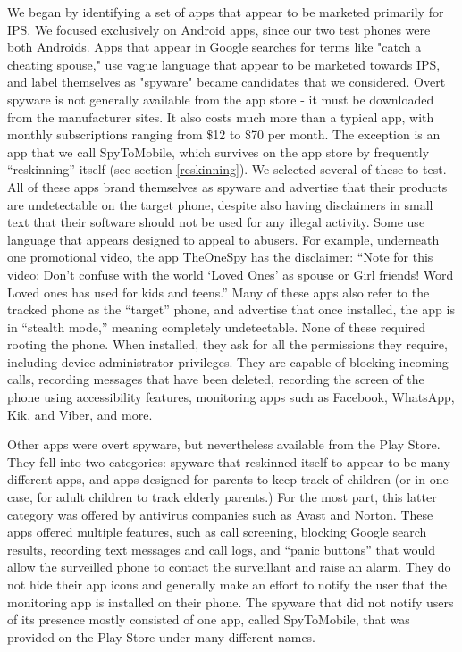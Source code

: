 \documentclass[acmtog]{acmart}
\begin{document}
We began by identifying a set of apps that appear to be 
marketed primarily for IPS. We focused exclusively on Android apps, since our 
two test phones were both Androids. Apps that appear in Google searches for 
terms like 
"catch a cheating spouse," use vague language that appear to be marketed 
towards IPS, and label themselves as "spyware" became candidates that we 
considered. Overt spyware is not generally available from the app store - it 
must be downloaded from the manufacturer sites. It also costs much more than a 
typical app, with monthly 
subscriptions ranging from \$12 to \$70 per month. The exception is an app that 
we call SpyToMobile, which survives on the app store by frequently 
``reskinning'' itself (see section \ref{reskinning}).  
We selected several of these to test. All of these apps brand themselves as 
spyware and advertise that their products are undetectable on the target phone, 
despite also having disclaimers in small text that their software should not be 
used for any illegal activity. Some use language that appears designed to 
appeal to abusers. For example, underneath one promotional 
video, the app TheOneSpy has the disclaimer: ``Note for this video: Don't 
confuse with the world `Loved Ones' as spouse or Girl friends! Word Loved ones 
has used for kids and teens.'' Many of these apps also refer to the tracked 
phone as the ``target'' phone, and advertise that once installed, the app is in 
``stealth mode,'' meaning completely undetectable. None of these required 
rooting the phone. When installed, they ask for all the permissions they 
require, including device administrator privileges. They are capable of 
blocking incoming calls, recording messages that have been deleted, recording 
the screen of the phone using accessibility features, monitoring apps such as 
Facebook, WhatsApp, Kik, and Viber, and more.

Other apps were overt spyware, but nevertheless available from the Play Store. 
They fell into two categories: spyware that reskinned itself to appear to be 
many different apps, and apps designed for parents to keep track of children 
(or in one case, for adult children to track elderly parents.) For the most 
part, this latter category was offered by antivirus companies such as Avast and 
Norton. These apps offered 
multiple features, such as call screening, blocking Google search results, 
recording text messages and call logs, and ``panic buttons'' that would allow 
the surveilled phone to contact the surveillant and raise an alarm. They do not 
hide their app icons and generally make an effort to notify the user that the 
monitoring app is installed on their phone. The spyware that did not notify 
users of its presence mostly consisted of one app, called SpyToMobile, that was 
provided on the Play Store under many different names. 
\end{document}
